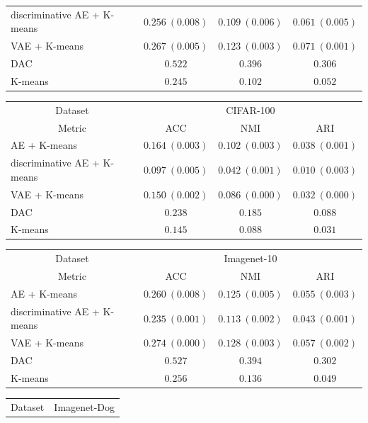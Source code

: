 \documentclass[12pt,DIV14,BCOR12mm,a4paper,footexclude,headinclude,halfparskip-,twoside,openright,cleardoubleempty,idxtotoc,bibtotoc,listtotoc,abstracton]{scrreprt} %
\numberwithin{equation}{chapter}
\begin{document}
\begin{table}[htb!]
\begin{tabular}{l|ccc}
        		discriminative AE + K-means & $0.256\ (0.008)$ & $0.109\ (0.006)$ & $0.061\ (0.005)$\\
        		VAE + K-means & $0.267\ (0.005)$ & $0.123\ (0.003)$ & $\mathbf{0.071}\ (0.001)$\\
        		DAC & $0.522$ & $0.396$ & $0.306$\\
        		K-means & $0.245$ & $0.102$ & $0.052$\\
    		\end{tabular}
    		\begin{tabular}{l|ccc}
    			\toprule
    			\multicolumn{1}{c}{Dataset} & \multicolumn{3}{c}{CIFAR-100}\\
        		\multicolumn{1}{c}{Metric} & ACC & NMI & ARI\\
        		\midrule
    			AE + K-means & $\mathbf{0.164}\ (0.003)$ & $\mathbf{0.102}\ (0.003)$ & $\mathbf{0.038}\ (0.001)$\\
        		discriminative AE + K-means& $0.097\ (0.005)$ & $0.042\ (0.001)$ & $0.010\ (0.003)$\\
        		VAE + K-means & $0.150\ (0.002)$ & $0.086\ (0.000)$ & $0.032\ (0.000)$\\
        		DAC & $0.238$ & $0.185$ & $0.088$\\
        		K-means & $0.145$ & $0.088$ & $0.031$\\
    		\end{tabular}
    		\begin{tabular}{l|ccc}
    			\toprule
    			\multicolumn{1}{c}{Dataset} & \multicolumn{3}{c}{Imagenet-10}\\
        		\multicolumn{1}{c}{Metric} & ACC & NMI & ARI\\
        		\midrule
    			AE + K-means & $0.260\ (0.008)$ & $0.125\ (0.005)$ & $0.055\ (0.003)$\\
        		discriminative AE + K-means& $0.235\ (0.001)$ & $0.113\ (0.002)$ & $0.043\ (0.001)$\\
        		VAE + K-means & $\mathbf{0.274}\ (0.000)$ & $0.128\ (0.003)$ & $\mathbf{0.057}\ (0.002)$\\
        		DAC & $0.527$ & $0.394$ & $0.302$\\
        		K-means & $0.256$ & $\mathbf{0.136}$ & $0.049$\\
    		\end{tabular}
    		\begin{tabular}{l|ccc}
    			\toprule
    			\multicolumn{1}{c}{Dataset} & \multicolumn{3}{c}{Imagenet-Dog}\\

\end{tabular}
\end{table}
\end{document}
